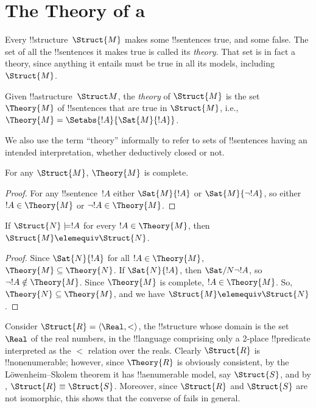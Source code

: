 \documentclass[../../../include/open-logic-section]{subfiles}
\begin{document}

\section{The Theory of a }

Every !!{structure}~$\Struct{M}$ makes some !!{sentence}s true, and
some false. The set of all the !!{sentence}s it makes true is called
its \emph{theory}. That set is in fact a theory, since anything it
entails must be true in all its models, including~$\Struct{M}$.

\begin{defn}
  Given !!a{structure}~$\Struct M$, the \emph{theory} of
  $\Struct{M}$ is the set $\Theory{M}$ of !!{sentence}s
  that are true in $\Struct{M}$, i.e., $\Theory{M} =
  \Setabs{!A}{\Sat{M}{!A}}$.
\end{defn}

We also use the term ``theory'' informally to refer to sets
of !!{sentence}s having an intended interpretation, whether deductively
closed or not.

\begin{prop}
For any $\Struct{M}$, $\Theory{M}$ is complete.
\end{prop}

\begin{proof}
For any !!{sentence}~$!A$ either $\Sat{M}{!A}$ or $\Sat{M}{\lnot !A}$,
so either $!A \in \Theory{M}$ or $\lnot !A \in \Theory{M}$.
\end{proof}

\begin{prop}
  If $\Struct{N} \models !A$ for every $!A \in \Theory{M}$, then
  $\Struct{M} \elemequiv \Struct{N}$.
\end{prop}

\begin{proof}
Since $\Sat{N}{!A}$ for all $!A \in \Theory{M}$, $\Theory{M} \subseteq
\Theory{N}$. If $\Sat{N}{!A}$, then $\Sat/{N}{\lnot !A}$, so $\lnot !A
\notin \Theory{M}$. Since $\Theory{M}$ is complete, $!A \in
\Theory{M}$. So, $\Theory{N} \subseteq \Theory{M}$, and we have
$\Struct{M} \elemequiv \Struct{N}$.
\end{proof}

\begin{rem}
  Consider $\Struct{R} = \langle\Real, <\rangle$, the !!{structure}
  whose domain is the set $\Real$ of the real numbers, in the !!{language}
  comprising only a 2-place !!{predicate} interpreted as the $<$
  relation over the reals. Clearly $\Struct{R}$ is !!{nonenumerable};
  however, since $\Theory{R}$ is obviously consistent, by the
  L\"owenheim--Skolem theorem it has !!a{enumerable} model, say
  $\Struct{S}$, and by , $\Struct{R}
  \equiv \Struct{S}$. Moreover, since $\Struct{R}$ and $\Struct{S}$
  are not isomorphic, this shows that the converse of
   fails in general.
\end{rem}
\end{document}
